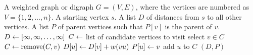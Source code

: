 
\begin{algorithmic}[1]
\Require A weighted graph or digraph $G = (V, E)$, where the vertices
  are numbered as $V = \{1, 2, \dots, n\}$. A starting vertex $s$.
\Ensure A list $D$ of distances from $s$ to all other vertices. A list
  $P$ of parent vertices such that $P[v]$ is the parent of $v$.
\State $D \leftarrow [\infty, \infty, \dots, \infty]$
\State $C \leftarrow$ list of candidate vertices to visit
  \State select $v \in C$
  \State $C \leftarrow \operatorname*{remove}(C, v)$
      \State $D[u] \leftarrow D[v] + w(vu)$
      \State $P[u] \leftarrow v$
        \State add $u$ to $C$
      \EndIf
    \EndIf
  \EndFor
\EndWhile
\State \Return $(D,P)$
\end{algorithmic}
